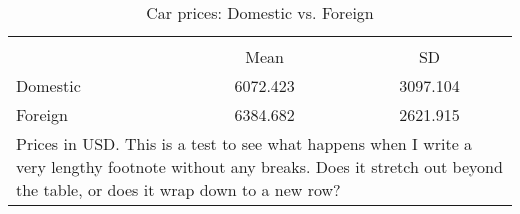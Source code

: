 \begin{table}[htbp]\centering
\caption{Car prices: Domestic vs. Foreign}
\label{table:prices_with_notes}
\def\sym#1{\ifmmode^{#1}\else\(^{#1}\)\fi}
\begin{tabular} {l*{1}{cc}}
\toprule 
&\multicolumn{2}{c}{}          \\
& Mean & SD                            \\
\midrule
Domestic &  6072.423 &  3097.104\\
Foreign &  6384.682 &  2621.915\\
\bottomrule
\multicolumn{3}{p{3in}}{\footnotesize Prices in USD. This is a test to see what happens when I write a very lengthy footnote without any breaks. Does it stretch out beyond the table, or does it wrap down to a new row?} \\
\end{tabular}
\end{table}